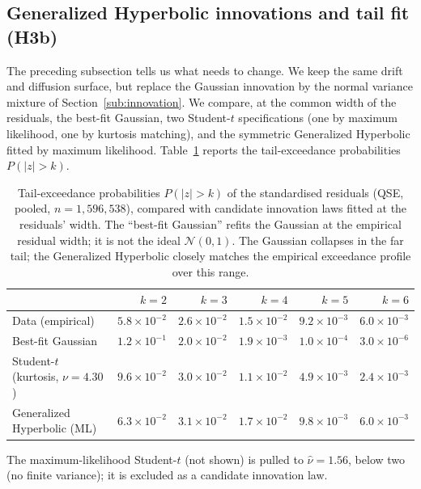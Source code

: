 \documentclass[11pt]{article}
\theoremstyle{plain}
\theoremstyle{definition}
\begin{document}
\subsection{Generalized Hyperbolic innovations and tail fit (H3b)}
\label{sub:res-gh}

The preceding subsection tells us what needs to change. We keep the same drift and
diffusion surface, but replace the Gaussian innovation by the normal variance
mixture of Section~\ref{sub:innovation}. We compare, at the common width of the residuals, the
best-fit Gaussian, two Student-$t$ specifications (one by maximum likelihood, one by
kurtosis matching), and the symmetric Generalized Hyperbolic fitted by maximum
likelihood. Table~\ref{tab:tails} reports the tail-exceedance probabilities
$P(|z|>k)$.

\begin{table}[!htbp]
\centering
\caption{Tail-exceedance probabilities $P(|z|>k)$ of the standardised residuals
(QSE, pooled, $n=1{,}596{,}538$), compared with candidate innovation laws fitted at the
residuals' width. The ``best-fit Gaussian'' refits the Gaussian at the empirical residual
width; it is not the ideal $\mathcal{N}(0,1)$. The Gaussian collapses in the far tail;
the Generalized Hyperbolic closely matches the empirical exceedance profile over this range.}
\label{tab:tails}
\small
\begin{tabular}{@{}lrrrrr@{}}
\toprule
 & $k{=}2$ & $k{=}3$ & $k{=}4$ & $k{=}5$ & $k{=}6$ \\
\midrule
Data (empirical)            & $5.8\times10^{-2}$ & $2.6\times10^{-2}$ & $1.5\times10^{-2}$ & $9.2\times10^{-3}$ & $6.0\times10^{-3}$ \\
Best-fit Gaussian           & $1.2\times10^{-1}$ & $2.0\times10^{-2}$ & $1.9\times10^{-3}$ & $1.0\times10^{-4}$ & $3.0\times10^{-6}$ \\
Student-$t$ (kurtosis, $\nu=4.30$)& $9.6\times10^{-2}$ & $3.0\times10^{-2}$ & $1.1\times10^{-2}$ & $4.9\times10^{-3}$ & $2.4\times10^{-3}$ \\
Generalized Hyperbolic (ML) & $6.3\times10^{-2}$ & $3.1\times10^{-2}$ & $1.7\times10^{-2}$ & $9.8\times10^{-3}$ & $6.0\times10^{-3}$ \\
\bottomrule
\end{tabular}
\par\smallskip
{\footnotesize\flushleft The maximum-likelihood Student-$t$ (not shown) is pulled to
$\hat{\nu}=1.56$, below two (no finite variance); it is excluded as a candidate
innovation law.}
\end{table}
\end{document}
